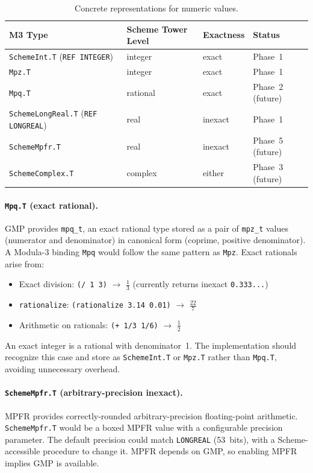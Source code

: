\documentclass[12pt]{article}
\begin{document}
\begin{table}[htbp]
\centering
\begin{tabular}{llll}
\toprule
\textbf{M3 Type} & \textbf{Scheme Tower Level} & \textbf{Exactness} & \textbf{Status} \\
\midrule
{\tt SchemeInt.T} ({\tt REF INTEGER}) & integer & exact & Phase~1 \\
{\tt Mpz.T} & integer & exact & Phase~1 \\
{\tt Mpq.T} & rational & exact & Phase~2 (future) \\
{\tt SchemeLongReal.T} ({\tt REF LONGREAL}) & real & inexact & Phase~1 \\
{\tt SchemeMpfr.T} & real & inexact & Phase~5 (future) \\
{\tt SchemeComplex.T} & complex & either & Phase~3 (future) \\
\bottomrule
\end{tabular}
\caption{Concrete representations for numeric values.}
\label{tab:repr}
\end{table}

\paragraph{{\tt Mpq.T} (exact rational).}
GMP provides {\tt mpq\_t}, an exact rational type stored as a
pair of {\tt mpz\_t} values (numerator and denominator) in
canonical form (coprime, positive denominator).  A Modula-3
binding {\tt Mpq} would follow the same pattern as {\tt Mpz}.
Exact rationals arise from:
\begin{itemize}[nosep]
\item Exact division: {\tt (/ 1 3)} $\to$ $\frac{1}{3}$
  (currently returns inexact {\tt 0.333...})
\item {\tt rationalize}: {\tt (rationalize 3.14 0.01)} $\to$ $\frac{22}{7}$
\item Arithmetic on rationals: {\tt (+ 1/3 1/6)} $\to$ $\frac{1}{2}$
\end{itemize}
An exact integer is a rational with denominator~1.  The
implementation should recognize this case and store as
{\tt SchemeInt.T} or {\tt Mpz.T} rather than {\tt Mpq.T},
avoiding unnecessary overhead.

\paragraph{{\tt SchemeMpfr.T} (arbitrary-precision inexact).}
MPFR provides correctly-rounded arbitrary-precision floating-point
arithmetic.  {\tt SchemeMpfr.T} would be a boxed MPFR value with
a configurable precision parameter.  The default precision could
match {\tt LONGREAL} (53~bits), with a Scheme-accessible
procedure to change it.  MPFR depends on GMP, so enabling MPFR
implies GMP is available.
\end{document}
